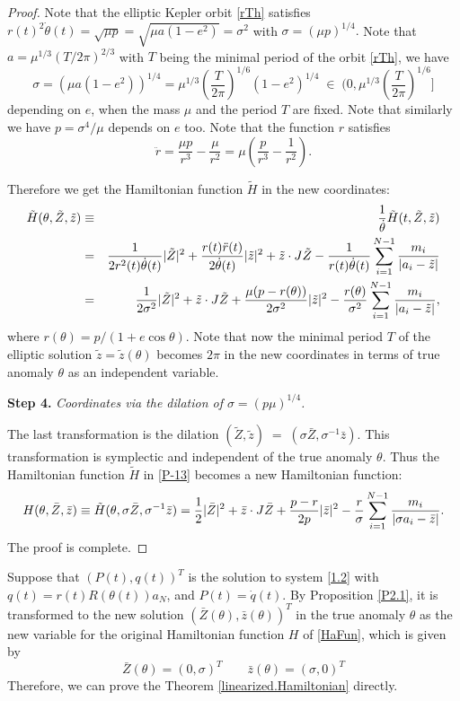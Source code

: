 \documentclass[11pt]{article}
\def\be{\begin{equation}}
\def\ee{\end{equation}}
\def\bea{\begin{eqnarray}}
\def\eea{\end{eqnarray}}
\def\nn{\nonumber}
\def\lb{\label}
\def\th{{\theta}}
\def\sg{{\sigma}}
\def\td#1{\tilde{#1}}
\begin{document}
\begin{proof}
  Note that the elliptic Kepler orbit \eqref{rTh} satisfies
  $ r(t)^2\dot{\th}(t) = \sqrt{\mu p} = \sqrt{\mu a(1-e^2)} = \sg^2$ with $\sg=(\mu p)^{1/4}.$
  Note that $a=\mu^{1/3}(T/2\pi)^{2/3}$ with $T$ being the minimal period of the orbit \eqref{rTh}, we have
  $$  \sg = (\mu a(1-e^2))^{1/4} = \mu^{1/3}(\frac{T}{2\pi})^{1/6}(1-e^2)^{1/4}\;\in\; (0,\mu^{1/3}(\frac{T}{2\pi})^{1/6}] $$
  depending on $e$, when the mass $\mu$ and the period $T$ are fixed. Note that similarly we have $p=\sg^4/\mu$ depends
  on $e$ too. Note that the function $r$ satisfies
  $$  \ddot{r} = \frac{\mu p}{r^3} - \frac{\mu}{r^2} = \mu\left(\frac{p}{r^3} - \frac{1}{r^2}\right).  $$
  
  Therefore we get the Hamiltonian function $\td{H}$ in the new coordinates:
  \bea
  \td{H}(\th,\td{Z},\td{z})
       &\equiv& \frac{1}{\dot{\th}}\td{H}(t,\td{Z},\td{z})   \nn\\
  &=& \frac{1}{2r^2(t)\dot{\th}(t)}|\td{Z}|^2
         + \frac{r(t)\ddot{r}(t)}{2\dot{\th}(t)}|\td{z}|^2 
         + \td{z}\cdot J\td{Z}
         - \frac{1}{r(t)\dot{\th}(t)}\sum_{i=1}^{N-1}{m_i\over|a_i-\tilde{z}|}  \nn\\
  &=& \frac{1}{2\sg^2}|\td{Z}|^2+ \td{z}\cdot J\td{Z}
         + \frac{\mu(p-r(\th))}{2\sg^2}|\td{z}|^2
         - \frac{r(\th)}{\sg^2}\sum_{i=1}^{N-1}{m_i\over|a_i-\tilde{z}|},  \lb{P-13}\eea
  where $r(\th)=p/(1+e\cos\th)$. Note that now the minimal period $T$ of the elliptic solution $\td{z}=\td{z}(\th)$
  becomes $2\pi$ in the new coordinates in terms of true anomaly $\th$ as an independent variable.
  
  
  {\bf Step 4.} {\it Coordinates via the dilation of $\sg=(p\mu)^{1/4}$.}
  
  The last transformation is the dilation $(\td{Z},\td{z}) \;=\;
        (\sg\bar{Z},\sg^{-1}\bar{z})$.
  This transformation is symplectic and independent of the true anomaly $\th$. Thus the
  Hamiltonian function $\td{H}$ in \eqref{P-13} becomes a new Hamiltonian function:
  \be
  H(\th,\bar{Z},\bar{z}) \equiv
      \td{H}(\th,\sg\bar{Z},\sg^{-1}\bar{z})  
      = \frac{1}{2}|\bar{Z}|^2 + \bar{z}\cdot J\bar{Z}
        + \frac{p-r}{2p}|\bar{z}|^2
        - \frac{r}{\sg}\sum_{i=1}^{N-1}{m_i\over|\sg a_i-\bar{z}|}.  \lb{P-15}
  \ee
  The proof is complete. 
\end{proof}



Suppose that  $(P(t),q(t))^T$ is the solution to  system \eqref{1.2} with
$
q(t)=r(t)R(\theta(t))a_{N}$, and $P(t)=\dot{q}(t).$
By Proposition  \ref{P2.1}, it is transformed to the new solution $(\bar{Z}(\theta),\bar{z}(\theta))^T$ in the true anomaly $\theta$ as the new
variable for the original Hamiltonian function $H$ of \eqref{HaFun}, which is
given by
\be
\bar{Z}(\theta)
=(0,  \sigma)^T
\qquad
\bar{z}(\theta) = 
(\sigma, 0)^T
\lb{sigma-solution}\ee
Therefore, we can prove the Theorem \ref{linearized.Hamiltonian} directly. 
\end{document}
